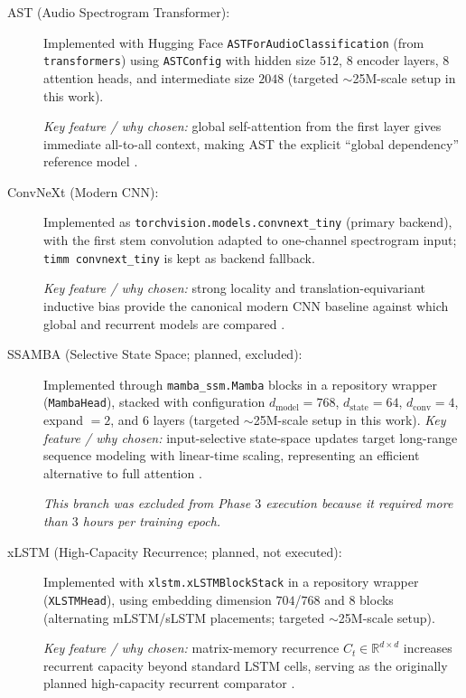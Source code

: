 \documentclass[cameraready]{Interspeech}
\begin{document}
\begin{description}
    \item[AST (Audio Spectrogram Transformer):] Implemented with Hugging Face \texttt{ASTForAudioClassification} (from \texttt{transformers}) using \texttt{ASTConfig} with hidden size $512$, $8$ encoder layers, $8$ attention heads, and intermediate size $2048$ (targeted $\sim$25M-scale setup in this work).

    \textit{Key feature / why chosen:} global self-attention from the first layer gives immediate all-to-all context, making AST the explicit ``global dependency'' reference model \cite{vaswani2017attention, gong2021ast}.

    \item[ConvNeXt (Modern CNN):] Implemented as \texttt{torchvision.models.convnext\_tiny} (primary backend), with the first stem convolution adapted to one-channel spectrogram input; \texttt{timm convnext\_tiny} is kept as backend fallback.

    \textit{Key feature / why chosen:} strong locality and translation-equivariant inductive bias provide the canonical modern CNN baseline against which global and recurrent models are compared \cite{lecun1995convolutional, liu2022convnet}.

    \item[SSAMBA (Selective State Space; planned, excluded):] Implemented through \texttt{mamba\_ssm.Mamba} blocks in a repository wrapper (\texttt{MambaHead}), stacked with configuration $d_{\text{model}}=768$, $d_{\text{state}}=64$, $d_{\text{conv}}=4$, expand $=2$, and $6$ layers (targeted $\sim$25M-scale setup in this work). \textit{Key feature / why chosen:} input-selective state-space updates target long-range sequence modeling with linear-time scaling, representing an efficient alternative to full attention \cite{gu2023mamba,shams2024ssamba}.

    \textit{This branch was excluded from Phase $3$ execution because it required more than $3$ hours per training epoch.}

    \item[xLSTM (High-Capacity Recurrence; planned, not executed):] Implemented with \texttt{xlstm.xLSTMBlockStack} in a repository wrapper (\texttt{XLSTMHead}), using embedding dimension $704$/$768$ and $8$ blocks (alternating mLSTM/sLSTM placements; targeted $\sim$25M-scale setup).

    \textit{Key feature / why chosen:} matrix-memory recurrence $C_t \in \mathbb{R}^{d \times d}$ increases recurrent capacity beyond standard LSTM cells, serving as the originally planned high-capacity recurrent comparator \cite{beck2024xlstm}.


\end{description}
\end{document}

